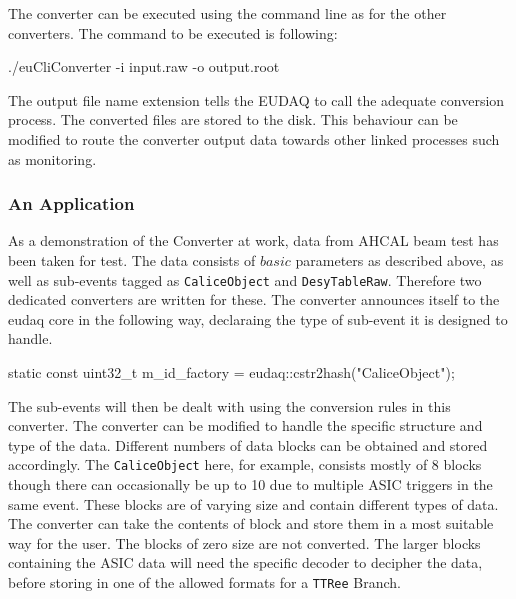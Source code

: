  The converter can be executed using the command line as for the other converters. The command to be executed is following:
 \begin{listing}[mybash]
./euCliConverter -i input.raw -o output.root
\end{listing}
 The output file name extension tells the EUDAQ to call the adequate conversion process. The converted files are stored to the disk. This behaviour can be modified to route the converter output data towards other linked processes such as monitoring. 

\subsubsection{ An Application} 
 As a demonstration of the Converter at work, data from AHCAL beam test has been taken for test. The data consists of $basic$ parameters as described above, as well as sub-events tagged as \lstinline[style=cpp]{CaliceObject} and \lstinline[style=cpp]{DesyTableRaw}. Therefore two dedicated converters are written for these. The converter announces itself to the eudaq core in the following way, declaraing the type of sub-event it is designed to handle.  
\begin{listing}[mybash]
static const uint32_t m_id_factory = eudaq::cstr2hash("CaliceObject");
\end{listing}
 The sub-events will then be dealt with using the conversion rules in this converter. The converter can be modified to handle the specific structure and type of the data. Different numbers of data blocks can be obtained and stored accordingly. The \lstinline[style=cpp]{CaliceObject} here, for example, consists mostly of 8 blocks though there can occasionally be up to 10 due to multiple ASIC triggers in the same event. These blocks are of varying size and contain different types of data. The converter can take the contents of block and store them in a most suitable way for the user. The blocks of zero size are not converted. The larger blocks containing the ASIC data will need the specific decoder to decipher the data, before storing in one of the allowed formats for a \lstinline[style=cpp]{TTRee} Branch. 


